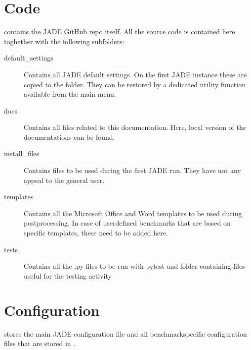 \documentclass[letterpaper,10pt,english]{sphinxmanual}
\begin{document}
\section{Code}
\label{\detokenize{usage/folders:code}}
 contains the JADE GitHub repo itself. All the source code is contained here toghether with the
following subfolders:
\begin{description}
\item[{default\_settings}] \leavevmode
Contains all JADE default settings. On the first JADE instance these are copied to the 
folder. They can be restored by a dedicated utility function available from the main menu.

\item[{docs}] \leavevmode
Contains all files related to this documentation. Here, local version of the documentations can be found.

\item[{install\_files}] \leavevmode
Contains files to be used during the first JADE run. They have not any appeal to the general user.

\item[{templates}] \leavevmode
Contains all the Microsoft Office and Word templates to be used during post\sphinxhyphen{}processing. In case of user\sphinxhyphen{}defined
benchmarks that are based on specific templates, these need to be added here.

\item[{tests}] \leavevmode
Contains all the .py files to be run with pytest and folder containing files useful for the testing activity

\end{description}


\section{Configuration}
\label{\detokenize{usage/folders:configuration}}
 stores the main JADE configuration file  and all benchmark\sphinxhyphen{}specific configuration
files that are stored in .
\end{document}
